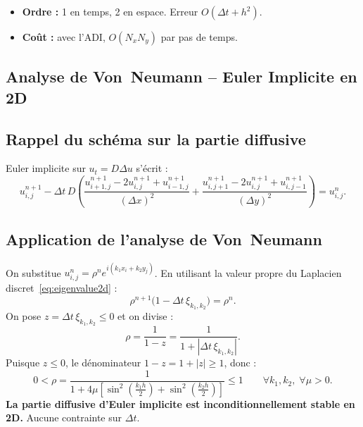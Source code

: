 \documentclass[11pt,a4paper]{report}
\begin{document}
\begin{itemize}[leftmargin=1.5em]
  \item \textbf{Ordre :} 1 en temps, 2 en espace. Erreur $O(\Delta t+h^2)$.
  \item \textbf{Co\^ut :} avec l'ADI, $O(N_xN_y)$ par pas de temps.
\end{itemize}



\subsection{Analyse de Von~Neumann -- Euler Implicite en 2D}
\label{sec:vonneumann_EI_2D}

\subsection*{Rappel du sch\'ema sur la partie diffusive}

Euler implicite sur $u_t=D\Delta u$ s'\'ecrit :
\begin{equation}
  u_{i,j}^{n+1}
  - \Delta t\,D\left(\frac{u_{i+1,j}^{n+1}-2u_{i,j}^{n+1}+u_{i-1,j}^{n+1}}{(\Delta x)^2}
                    +\frac{u_{i,j+1}^{n+1}-2u_{i,j}^{n+1}+u_{i,j-1}^{n+1}}{(\Delta y)^2}\right)
  = u_{i,j}^n.
\end{equation}

\subsection*{Application de l'analyse de Von~Neumann}

On substitue $u_{i,j}^n=\rho^n e^{i(k_1x_i+k_2y_j)}$. En utilisant la valeur propre
du Laplacien discret~\eqref{eq:eigenvalue2d} :
\begin{equation}
  \rho^{n+1}\bigl(1 - \Delta t\,\xi_{k_1,k_2}\bigr) = \rho^n.
\end{equation}
On pose $z=\Delta t\,\xi_{k_1,k_2}\le 0$ et on divise :
\begin{equation}
  \rho = \frac{1}{1-z} = \frac{1}{1+|\Delta t\,\xi_{k_1,k_2}|}.
\end{equation}
Puisque $z\le 0$, le d\'enominateur $1-z=1+|z|\ge 1$, donc :
\begin{equation}
  0 < \rho = \frac{1}{1+4\mu\!\left[\sin^2\!\!\left(\frac{k_1h}{2}\right)+\sin^2\!\!\left(\frac{k_2h}{2}\right)\right]} \le 1
  \qquad\forall k_1,k_2,\;\forall \mu>0.
\end{equation}
\textbf{La partie diffusive d'Euler implicite est inconditionnellement stable en 2D.}
Aucune contrainte sur $\Delta t$.
\end{document}
